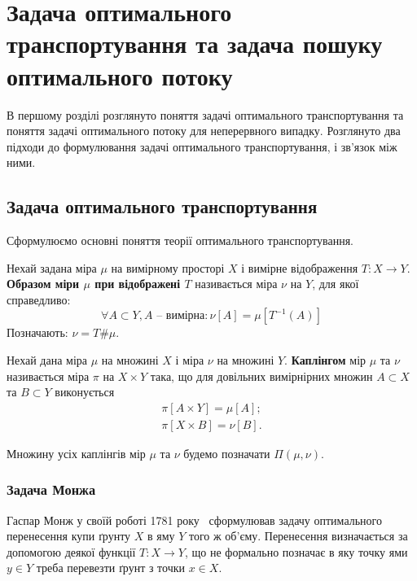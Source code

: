 \chapter{Задача оптимального транспортування та задача пошуку оптимального потоку}
\label{chap:review}
В першому розділі розглянуто поняття задачі оптимального транспортування та 
поняття задачі оптимального потоку для неперервного випадку.
Розглянуто два підходи до формулювання задачі оптимального транспортування, і зв'язок між ними.

\section{Задача оптимального транспортування}
Сформулюємо основні поняття теорії оптимального транспортування.

\begin{definition}
    \label{def:push-forward}
    Нехай задана міра $\mu$ на вимірному просторі $X$ і вимірне відображення $T : X \to Y$.
    \textbf{Образом міри $\mu$ при відображені $T$} називається міра $\nu$ на $Y$, для якої справедливо:
    $$
        \forall A \subset Y, A\text{ -- вимірна}: \nu[A] = \mu\left[T^{-1}(A)\right]
    $$
    Позначають: $\nu = T \# \mu$.
\end{definition}


\begin{definition}
    \label{def:coupling}
    Нехай дана міра $\mu$ на множині $X$ і міра $\nu$ на множині $Y$. \textbf{Каплінгом} мір $\mu$ та $\nu$ називається
    міра $\pi$ на $X \times Y$ така, що для довільних вимірнірних множин $A \subset X$ та $B \subset Y$ виконується
    \begin{eqnarray}
        \pi[A \times Y] = \mu[A]; \\
        \pi[X \times B] = \nu[B].
    \end{eqnarray}
\end{definition}

Множину усіх каплінгів мір $\mu$ та $\nu$ будемо позначати $\Pi(\mu, \nu)$.

\subsection{Задача Монжа}
Гаспар Монж у своїй роботі 1781 року~\cite{monge1781} сформулював задачу оптимального перенесення купи ґрунту $X$ 
в яму $Y$ того ж об'єму. Перенесення визначається за допомогою деякої функції $T : X \to Y$, що не формально
позначає в яку точку ями $y \in Y$ треба перевезти ґрунт з точки $x \in X$.

